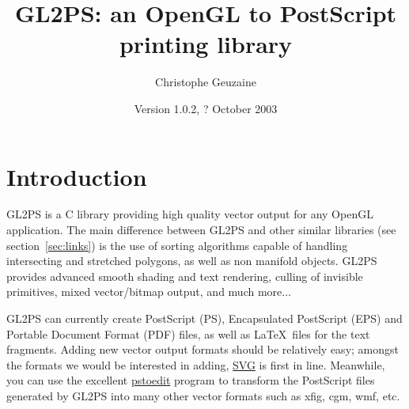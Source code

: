 \documentclass[10pt]{article}
\begin{document}
\title{GL2PS: an OpenGL to PostScript printing library}
\author{Christophe Geuzaine}
\date{Version 1.0.2, ? October 2003}

\maketitle



\tableofcontents

\section{Introduction}

GL2PS is a C library providing high quality vector output for any OpenGL
application. The main difference between GL2PS and other similar libraries
(see section~\ref{sec:links}) is the use of sorting algorithms capable of
handling intersecting and stretched polygons, as well as non manifold
objects. GL2PS provides advanced smooth shading and text rendering, culling
of invisible primitives, mixed vector/bitmap output, and much more...

GL2PS can currently create PostScript (PS), Encapsulated PostScript (EPS)
and Portable Document Format (PDF) files, as well as \LaTeX\ files for the
text fragments. Adding new vector output formats should be relatively easy;
amongst the formats we would be interested in adding,
\href{http://www.w3.org/Graphics/SVG/}{SVG} is first in line. Meanwhile, you
can use the excellent \href{http://www.pstoedit.net}{pstoedit} program to
transform the PostScript files generated by GL2PS into many other vector
formats such as xfig, cgm, wmf, etc.
\end{document}
